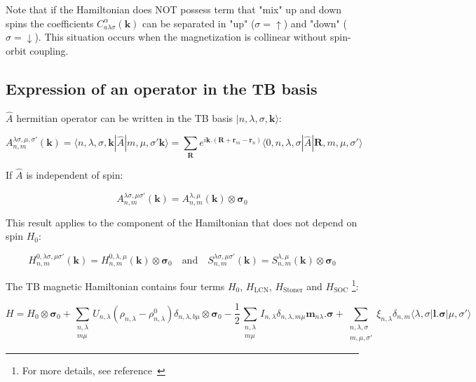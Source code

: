 \documentclass{article}
\newcommand{\bra}[1]{\langle #1|}
\newcommand{\ket}[1]{|#1\rangle}
\newcommand{\op}[1]{\hat{#1}}
\begin{document}
\noindent
Note that if the Hamiltonian does NOT possess term that "mix" up and down spins the coefficients $C_{a \lambda \sigma}^{\alpha}(\mathbf{k})$ can be separated in "up" ($\sigma=\uparrow $) and "down" ($\sigma=\downarrow $). This situation occurs when the magnetization is collinear without spin-orbit coupling.


\subsection{Expression of an operator in the TB basis}


\noindent $\op{A}$ hermitian operator
can be written in the TB basis $\ket{n,\lambda,\sigma,\mathbf{k}}$:

\[\displaystyle A_{n,m}^{\lambda \sigma,\mu, \sigma'}(\mathbf{k})=
\bra{n,\lambda,\sigma,\mathbf{k}}\op{A}\ket{m,\mu,
\sigma'\mathbf{k}}= \sum_{\mathbf{R}}
e^{i\mathbf{k}.(\mathbf{R}+\mathbf{r}_{m}-\mathbf{r}_n)} \bra{0,n,\lambda,\sigma }
 \op{A} \ket{\mathbf{R},m,\mu,\sigma'} \]

\noindent
If $\op{A}$ is independent of spin:

\[ \displaystyle A_{n,m}^{\lambda \sigma,\mu 
\sigma'}(\mathbf{k})= A_{n,m}^{\lambda,\mu}(\mathbf{k}) \otimes \bm{\sigma}_0 \]

\noindent
This result applies to the component of the Hamiltonian that does not depend on spin $H_0$:

\[ H_{n,m}^{0,\lambda \sigma, \mu \sigma'} (\mathbf{k}) 
=H_{n,m}^{0, \lambda, \mu} (\mathbf{k}) \otimes \bm{\sigma}_0
\quad \text{and} \quad
S_{n,m}^{\lambda \sigma, \mu \sigma'} (\mathbf{k}) 
=S_{n,m}^{\lambda, \mu} (\mathbf{k}) \otimes \bm{\sigma}_0
\]

\noindent The TB magnetic Hamiltonian contains four terms $H_0$, $H_{\text{LCN}}$, $H_{\text{Stoner}}$ and $H_{\text{SOC}}$ \footnote{\noindent For more details, see reference~\cite{barreteauEfficientMagneticTightbinding2016}}:


\[\displaystyle H=H_0\otimes\bm{\sigma}_0
+\sum_{\substack{n,\lambda\\m \mu} } U_{n,\lambda}
(\rho_{n,\lambda}-\rho_{n,\lambda}^0) \delta_{n,\lambda,b \mu
}\otimes\bm{\sigma}_0 -\frac{1}{2}\sum_{\substack{n,\lambda\\m \mu}} I_{n,\lambda} \delta_{n,\lambda,m \mu } \mathbf{m}_{n \lambda}.\bm{\sigma}  
+ \sum_{\substack{n,\lambda, \sigma\\ m, \mu, \sigma'} } \xi_{n,\lambda} \delta_{n,m} 
\bra{\lambda,\sigma} \mathbf{l}.\mathbf{\sigma}\ket{\mu,\sigma'}
\]
\end{document}
